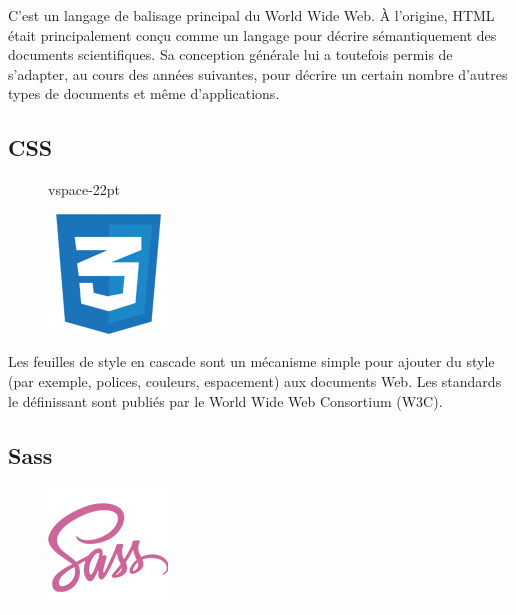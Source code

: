 C'est un langage de balisage principal du World Wide Web. À l'origine, HTML 
était principalement conçu comme un langage pour décrire sémantiquement des 
documents scientifiques. Sa conception générale lui a toutefois permis de 
s’adapter, au cours des années suivantes, pour décrire un certain nombre 
d’autres types de documents et même d’applications\cite{14}.

\subsection{CSS}
\begin{figure}
    vspace{-22pt}
    \begin{center}
        \includegraphics[scale=0.36]{images/logo/css.png}
        \label{fig71}
    \end{center}
    \vspace{-20pt}
    \vspace{-10pt}
\end{figure}

Les feuilles de style en cascade sont un mécanisme simple pour ajouter du style 
(par exemple, polices, couleurs, espacement) aux documents Web. Les standards le 
définissant sont publiés par le World Wide Web Consortium (W3C)\cite{15}.

\subsection{Sass}
\begin{figure}
    \vspace{-22pt}
    \begin{center}
        \includegraphics[scale=0.36]{images/logo/sass.png}
        \label{fig72}
    \end{center}
    \vspace{-20pt}
    \vspace{-10pt}
\end{figure}

